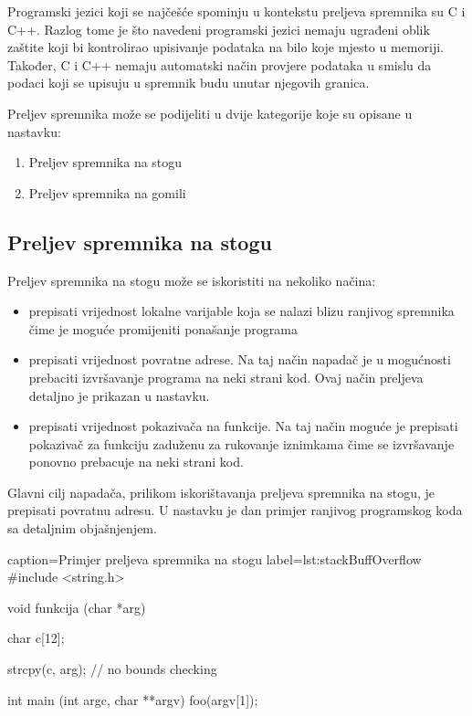 \documentclass[times, utf8, diplomski, numeric]{fer}
\begin{document}
Programski jezici koji se najčešće spominju u kontekstu preljeva
spremnika su C i C++. Razlog tome je što navedeni programski
jezici nemaju ugrađeni oblik zaštite koji bi kontrolirao				%
upisivanje podataka na bilo koje mjesto u memoriji. Također, C i
C++ nemaju automatski način provjere podataka u smislu da podaci
koji se upisuju u spremnik budu unutar njegovih granica.

Preljev spremnika može se podijeliti u dvije kategorije koje su
opisane u nastavku:

\begin{enumerate}
\item Preljev spremnika na stogu
\item Preljev spremnika na gomili
\end{enumerate}

\subsection{Preljev spremnika na stogu}

Preljev spremnika na stogu može se iskoristiti na nekoliko
načina:

\begin{itemize}
\item prepisati vrijednost lokalne varijable koja se nalazi blizu
ranjivog spremnika čime je moguće promijeniti ponašanje programa
\item prepisati vrijednost povratne adrese. Na taj način napadač
je u mogućnosti prebaciti izvršavanje programa na neki strani
kod. Ovaj način preljeva detaljno je prikazan u nastavku.
\item prepisati vrijednost pokazivača na funkcije. Na taj način
moguće je prepisati pokazivač za funkciju zaduženu za rukovanje
iznimkama čime se izvršavanje ponovno prebacuje na neki strani
kod.
\end{itemize}

Glavni cilj napadača, prilikom iskorištavanja preljeva spremnika
na stogu, je prepisati povratnu adresu. U nastavku je dan primjer
ranjivog programskog koda sa detaljnim objašnjenjem.

\begin{ispis} {caption=Primjer preljeva spremnika na stogu} {label=lst:stackBuffOverflow}
#include <string.h>
 
void funkcija (char *arg)
{
   char  c[12];
 
   strcpy(c, arg);  // no bounds checking
}
 
int main (int argc, char **argv)
{
   foo(argv[1]);
}
\end{ispis}
\end{document}
